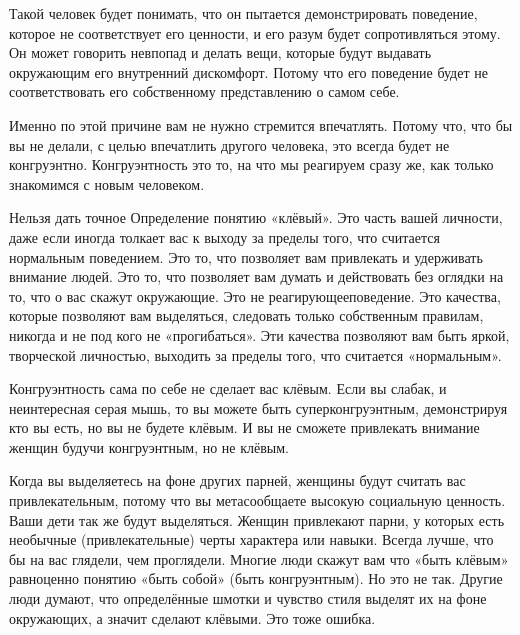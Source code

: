Такой человек будет понимать, что он пытается демонстрировать поведение, которое не соответствует его ценности, и его разум будет сопротивляться этому. Он может говорить невпопад и делать вещи, которые будут выдавать окружающим его внутренний дискомфорт. Потому что его поведение будет не соответствовать его собственному представлению о самом себе.

Именно по этой причине вам не нужно стремится впечатлять. Потому что, что бы вы не делали, с целью впечатлить другого человека, это всегда будет не конгруэнтно. Конгруэнтность это то, на что мы реагируем сразу же, как только знакомимся с новым человеком.

Нельзя дать точное Определение понятию «клёвый». Это часть вашей личности, даже если иногда толкает вас к выходу за пределы того, что считается нормальным поведением. Это то, что позволяет вам привлекать и удерживать внимание людей. Это то, что позволяет вам думать и действовать без оглядки на то, что о вас скажут окружающие. Это не реагирующееповедение. Это качества, которые позволяют вам выделяться, следовать только собственным правилам, никогда и не под кого не «прогибаться». Эти качества позволяют вам быть яркой, творческой личностью, выходить за пределы того, что считается «нормальным».

Конгруэнтность сама по себе не сделает вас клёвым. Если вы слабак, и неинтересная серая мышь, то вы можете быть суперконгруэнтным, демонстрируя кто вы есть, но вы не будете клёвым. И вы не сможете привлекать внимание женщин будучи конгруэнтным, но не клёвым.

\RULE  Когда вы выделяетесь на фоне других парней, женщины будут считать вас привлекательным, потому что вы метасообщаете высокую социальную ценность. Ваши дети так же будут выделяться. Женщин привлекают парни, у которых есть необычные (привлекательные) черты характера или навыки. Всегда лучше, что бы на вас глядели, чем проглядели. Многие люди скажут вам что «быть клёвым» равноценно понятию «быть собой» (быть конгруэнтным). Но это не так. Другие люди думают, что определённые шмотки и чувство стиля выделят их на фоне окружающих, а значит сделают клёвыми. Это тоже ошибка.

